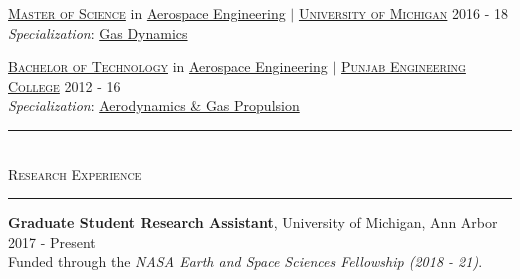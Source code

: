 \documentclass[10pt]{article}
\begin{document}



\vspace{0.5em}
\href{https://aero.engin.umich.edu/academics/graduate/mse/}{\textsc{Master of Science}} in \href{https://aero.engin.umich.edu/}{Aerospace Engineering} $|$ \textsc{{\href{http://umich.edu/}{ {University of Michigan}}}} \hfill {2016 - 18}\\ 
\emph{Specialization}: \href{https://aero.engin.umich.edu/research/areas/gas/}{Gas Dynamics} %

\vspace{0.5em}
\href{http://www.pec.ac.in/programmes/ug/structure}{\textsc{Bachelor of Technology}} in \href{http://www.pec.ac.in/aero}{Aerospace Engineering} $|$ \href{http://www.pec.ac.in/}{\textsc{{Punjab Engineering College}}} \hfill {2012 - 16} \\
\emph{Specialization}: \href{http://www.pec.ac.in/aero/peo}{Aerodynamics \& Gas Propulsion}

\vspace{-0.75em}


\begin{center}
{\noindent\rule[0.5ex]{\linewidth}{0.5pt}\\
\vspace{-0.5em}\large{\textsc{Research Experience}}
\\ \vspace{-0.25em}
\noindent\rule[0.5ex]{\linewidth}{0.5pt}}
\end{center}

\vspace{-1em}
\textbf{Graduate Student Research Assistant}, {{University of Michigan, Ann Arbor}} \hfill \normalsize{2017 - Present}\\ 
Funded through the \emph{NASA Earth and Space Sciences Fellowship (2018 - 21)}.
\end{document}
